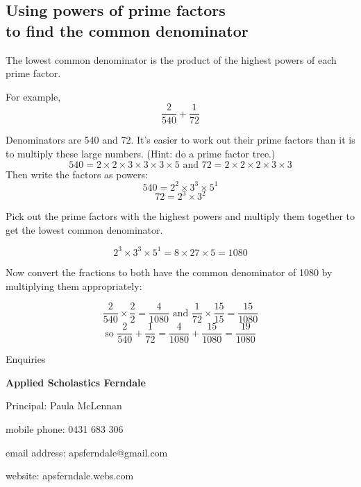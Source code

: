 \documentclass[16pt]{article}
\begin{document}
\begin{spacing}{1.25}

\pagebreak

\subsection*{Using powers of prime factors\\ to find the common denominator}


The lowest common denominator is the product of the highest powers of each prime factor.

For example, $$\frac{2}{540} + \frac{1}{72}$$

Denominators are 540 and 72. It’s easier to work out their prime factors than it is to multiply these large numbers. (Hint: do a prime factor tree.)
$$540 = 2 \times 2 \times 3 \times 3 \times 3 \times 5 \text{ and }72 = 2 \times 2 \times 2 \times 3 \times 3$$
Then write the factors as powers:
$$540 = 2^2 \times \boxed{3^3} \times \boxed{5^1}$$
$$72 = \boxed{2^3} \times 3^2$$

Pick out the prime factors with the highest powers and multiply them together to get the lowest common denominator.

$$2^3 \times 3^3 \times 5^1 = 8 \times 27 \times 5 = 1080$$

Now convert the fractions to both have the common denominator of 1080 by multiplying them appropriately:

$$\frac{2}{540} \times \frac{2}{2} = \frac{4}{1080}\text{ and }\frac{1}{72} \times \frac{15}{15} = \frac{15}{1080}$$
$$\text{so }\frac{2}{540} + \frac{1}{72} = \frac{4}{1080} + \frac{15}{1080} = \frac{19}{1080}$$

\vspace*{\fill}
\begin{center}
\linespread{2}\large

Enquiries

\textbf{Applied Scholastics Ferndale}

Principal: Paula McLennan

mobile phone: 0431 683 306

email address: apsferndale@gmail.com

website: apsferndale.webs.com
\end{center}
\vspace*{\fill}

\end{spacing}
\end{document}
